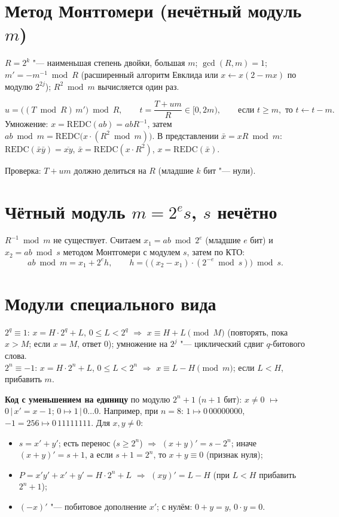 \documentclass{ca-handout}
\begin{document}
\makehandouttitle

\section{Метод Монтгомери (нечётный модуль $m$)}
$R = 2^k$ "--- наименьшая степень двойки, большая $m$; $\gcd(R, m) = 1$;
$m' = -m^{-1} \bmod R$ (расширенный алгоритм Евклида или $x \gets x(2 - mx)$ по модулю
$2^{2j}$); $R^2 \bmod m$ вычисляется один раз.
\begin{reminder}[title={$\mathrm{REDC}(T) = TR^{-1} \bmod m$ при $0 \le T < mR$}]
\[
  u = \bigl((T \bmod R)\, m'\bigr) \bmod R, \qquad t = \frac{T + um}{R} \in [0, 2m), \qquad
  \text{если } t \ge m, \text{ то } t \gets t - m.
\]
Умножение: $x = \mathrm{REDC}(ab) = abR^{-1}$, затем
$ab \bmod m = \mathrm{REDC}\bigl(x \cdot (R^2 \bmod m)\bigr)$.
В представлении $\bar x = xR \bmod m$: $\mathrm{REDC}(\bar x \bar y) = \overline{xy}$,
$\bar x = \mathrm{REDC}(x \cdot R^2)$, $x = \mathrm{REDC}(\bar x)$.
\end{reminder}
Проверка: $T + um$ должно делиться на $R$ (младшие $k$ бит "--- нули).

\section{Чётный модуль $m = 2^e s$, $s$ нечётно}
$R^{-1} \bmod m$ не существует. Считаем $x_1 = ab \bmod 2^e$ (младшие $e$ бит) и
$x_2 = ab \bmod s$ методом Монтгомери с модулем $s$, затем по КТО:
\[
  ab \bmod m = x_1 + 2^e h, \qquad h = \bigl((x_2 - x_1) \cdot (2^{-e} \bmod s)\bigr) \bmod s.
\]

\section{Модули специального вида}
\begin{reminder}[title={Мерсенн $M = 2^q - 1$ и Ферма $m = 2^n + 1$}]
$2^q \equiv 1$: $x = H \cdot 2^q + L$, $0 \le L < 2^q$ $\Rightarrow$ $x \equiv H + L \pmod M$ (повторять, пока $x > M$; если $x = M$, ответ $0$);
умножение на $2^j$ "--- циклический сдвиг $q$-битового слова.\\
$2^n \equiv -1$: $x = H \cdot 2^n + L$, $0 \le L < 2^n$ $\Rightarrow$ $x \equiv L - H \pmod m$; если $L < H$, прибавить $m$.
\end{reminder}
\textbf{Код с уменьшением на единицу} по модулю $2^n + 1$ ($n + 1$ бит): $x \ne 0$ $\mapsto$
$0 \,|\, x' = x - 1$; $0 \mapsto 1 \,|\, 0\dots0$. Например, при $n = 8$: $1 \mapsto 0\,00000000$,
$-1 = 256 \mapsto 0\,11111111$. Для $x, y \ne 0$:
\begin{itemize}
  \item $s = x' + y'$; есть перенос ($s \ge 2^n$) $\Rightarrow$ $(x + y)' = s - 2^n$; иначе
    $(x + y)' = s + 1$, а если $s + 1 = 2^n$, то $x + y \equiv 0$ (признак нуля);
  \item $P = x'y' + x' + y' = H \cdot 2^n + L$ $\Rightarrow$ $(xy)' = L - H$ (при $L < H$
    прибавить $2^n + 1$);
  \item $(-x)'$ "--- побитовое дополнение $x'$; с нулём: $0 + y = y$, $0 \cdot y = 0$.
\end{itemize}
\end{document}
